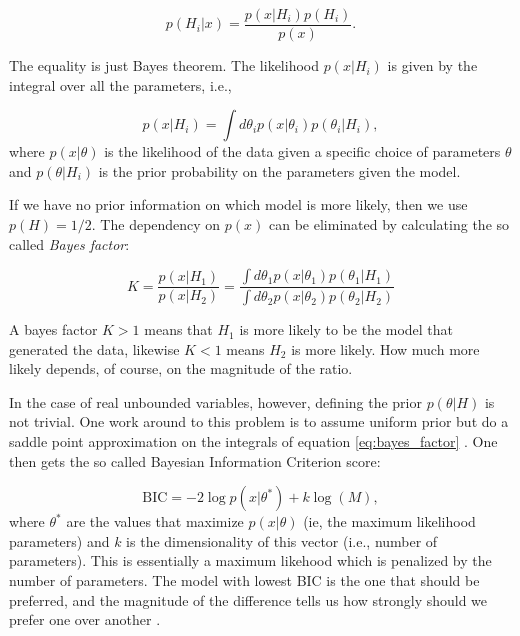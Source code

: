 \begin{equation}
  \label{eq:5}
  p(H_i | x) = \frac{p(x | H_i) p(H_i)}{p(x)}.
\end{equation}

The equality is just Bayes theorem. The likelihood $p(x | H_i)$ is
given by the integral over all the parameters, i.e.,

\begin{equation}
  \label{eq:7}
  p(x | H_i) = \int d\theta_i p(x | \theta_i) p(\theta_i | H_i),
\end{equation}
where $p(x | \theta)$ is the likelihood of the data given a specific
choice of parameters $\theta$ and $p(\theta | H_i)$ is the prior
probability on the parameters given the model.

If we have no prior information on which model is more likely, then we
use $p(H) = 1/2$. The dependency on $p(x)$ can be eliminated by
calculating the so called \emph{Bayes factor}:

\begin{equation}
  \label{eq:bayes_factor}
  K = \frac{p(x | H_1)}{p(x | H_2)} = \frac{\int d\theta_1 p(x | \theta_1) p(\theta_1 | H_1)}{\int d\theta_2 p(x | \theta_2) p(\theta_2 | H_2)}
\end{equation}

A bayes factor $K>1$ means that $H_1$ is more likely to be the model
that generated the data, likewise $K<1$ means $H_2$ is more
likely. How much more likely depends, of course, on the magnitude of
the ratio.

In the case of real unbounded variables, however, defining the prior
$p(\theta | H)$ is not trivial. One work around to this problem is to
assume uniform prior but do a saddle point approximation on the integrals
of equation \ref{eq:bayes_factor} \cite{BishopBook}. One then gets the
so called Bayesian Information Criterion score:

\begin{equation}
  \label{eq:BIC}
  \text{BIC} = -2\log p(x | \theta^{*}) + k \log(M),
\end{equation}
where $\theta^*$ are the values that maximize $p(x|\theta)$ (ie, the
maximum likelihood parameters) and $k$ is the dimensionality of this
vector (i.e., number of parameters). This is essentially a maximum
likehood which is penalized by the number of parameters. The model
with lowest BIC is the one that should be preferred, and the magnitude
of the difference tells us how strongly should we prefer one over
another \cite{Kass95}.
